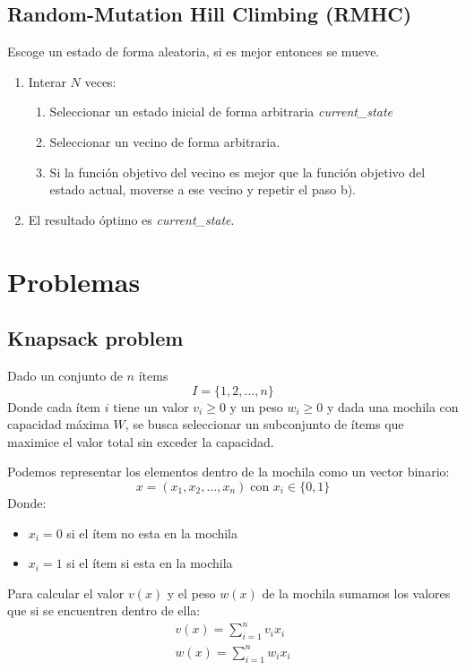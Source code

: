 \documentclass[12pt,twoside]{article}
\begin{document}
	\subsection{Random-Mutation Hill Climbing (RMHC)}
	
	Escoge un estado de forma aleatoria, si es mejor entonces se mueve.
	
	\begin{enumerate}
		\item Interar $N$ veces:
		\begin{enumerate}
			\item Seleccionar un estado inicial de forma arbitraria \textit{current\_state}
			\item Seleccionar un vecino de forma arbitraria. 
			\item Si la función objetivo del vecino es mejor que la función objetivo del estado actual, moverse a ese vecino y repetir el paso b).
		\end{enumerate}
		\item El resultado óptimo es \textit{current\_state}.
	\end{enumerate}
	
	
	\clearpage
	\section{Problemas}
	
	\subsection{Knapsack problem}
	
	Dado un conjunto de $n$ ítems \[I = \{1,2, \dots, n \}\] Donde cada ítem $i$ tiene un valor $v_i \geq 0$ y un peso $w_i \geq 0$ y dada una mochila con capacidad máxima $W$, se busca seleccionar un subconjunto de ítems que maximice el valor total sin exceder la capacidad.
	
	Podemos representar los elementos dentro de la mochila como un vector binario: 
	\[ x = (x_1, x_2, \dots , x_n) \; \text{con } x_i \in \{0, 1\} \]
	Donde:
	\begin{itemize}
		\item $x_i = 0$ si el ítem no esta en la mochila
		\item $x_i = 1$ si el ítem si esta en la mochila
	\end{itemize}
	
	Para calcular el valor $v(x)$ y el peso $w(x)$ de la mochila sumamos los valores que si se encuentren dentro de ella:
	\begin{gather*}
		v(x) = \sum_{i = 1}^{n} v_i x_i \\
		w(x) = \sum_{i = 1}^{n} w_i x_i 
	\end{gather*}
	
\end{document}
